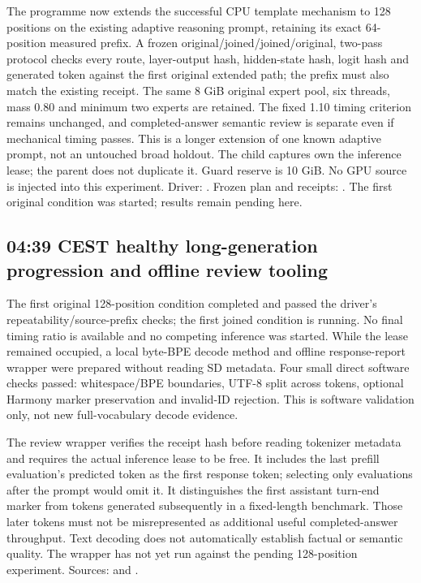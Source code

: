 The programme now extends the successful CPU template mechanism to 128
positions on the existing adaptive reasoning prompt, retaining its exact
64-position measured prefix. A frozen original/joined/joined/original,
two-pass protocol checks every route, layer-output hash, hidden-state hash,
logit hash and generated token against the first original extended path;
the prefix must also match the existing receipt. The same 8 GiB original
expert pool, six threads, mass 0.80 and minimum two experts are retained.
The fixed 1.10 timing criterion remains unchanged, and completed-answer
semantic review is separate even if mechanical timing passes. This is a
longer extension of one known adaptive prompt, not an untouched broad holdout.
The child captures own the inference lease; the parent does not duplicate it.
Guard reserve is 10 GiB. No GPU source is injected into this experiment.
Driver: .
Frozen plan and receipts: .
The first original condition was started; results remain pending here.

\subsection{04:39 CEST healthy long-generation progression and offline review tooling}
The first original 128-position condition completed and passed the driver's
repeatability/source-prefix checks; the first joined condition is running.
No final timing ratio is available and no competing inference was started.
While the lease remained occupied, a local byte-BPE decode method and offline
response-report wrapper were prepared without reading SD metadata. Four small
direct software checks passed: whitespace/BPE boundaries, UTF-8 split across
tokens, optional Harmony marker preservation and invalid-ID rejection.
This is software validation only, not new full-vocabulary decode evidence.

The review wrapper verifies the receipt hash before reading tokenizer metadata
and requires the actual inference lease to be free. It includes the last
prefill evaluation's predicted token as the first response token; selecting
only evaluations after the prompt would omit it. It distinguishes the first
assistant turn-end marker from tokens generated subsequently in a fixed-length
benchmark. Those later tokens must not be misrepresented as additional useful
completed-answer throughput. Text decoding does not automatically establish
factual or semantic quality. The wrapper has not yet run against the pending
128-position experiment. Sources:
 and
.


